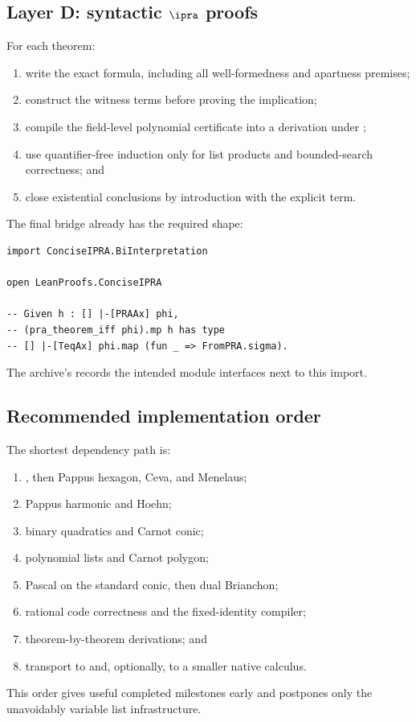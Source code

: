 \subsection{Layer D: syntactic \texorpdfstring{$\ipra$}{iPRA} proofs}

For each theorem:
\begin{enumerate}
\item write the exact  formula, including all well-formedness
and apartness premises;
\item construct the witness terms before proving the implication;
\item compile the field-level polynomial certificate into a derivation under
;
\item use quantifier-free induction only for list products and bounded-search
correctness; and
\item close existential conclusions by introduction with the explicit term.
\end{enumerate}

The final bridge already has the required shape:
\begin{lstlisting}[language={}]
import ConciseIPRA.BiInterpretation

open LeanProofs.ConciseIPRA

-- Given h : [] |-[PRAAx] phi,
-- (pra_theorem_iff phi).mp h has type
-- [] |-[TeqAx] phi.map (fun _ => FromPRA.sigma).
\end{lstlisting}
The archive's  records the intended
module interfaces next to this import.

\subsection{Recommended implementation order}

The shortest dependency path is:
\begin{enumerate}
\item {}, then Pappus hexagon, Ceva, and Menelaus;
\item Pappus harmonic and Hoehn;
\item binary quadratics and Carnot conic;
\item polynomial lists and Carnot polygon;
\item Pascal on the standard conic, then dual Brianchon;
\item rational code correctness and the fixed-identity compiler;
\item theorem-by-theorem  derivations; and
\item transport to  and, optionally, to a smaller native calculus.
\end{enumerate}
This order gives useful completed milestones early and postpones only the
unavoidably variable list infrastructure.

